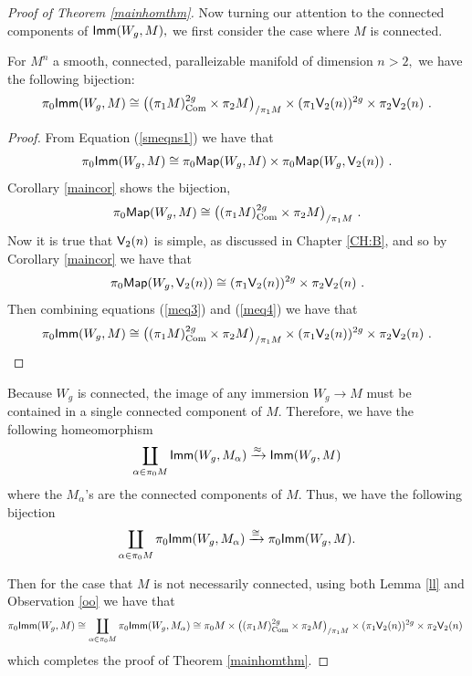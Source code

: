 \begin{proof}[Proof of Theorem \ref{mainhomthm}]
Now turning our attention to the connected components of ${\sf Imm}(W_{g}, M),$ we first consider the case where $M$ is connected.

\begin{lemma}\label{ll}
For $M^{n}$ a smooth, connected, paralleizable manifold of dimension $n > 2,$ we have the following bijection:
\[
\pi_{0}{\sf Imm}(W_{g}, M) \cong  \bigl((\pi_{1}M)^{2g}_{\rm Com} \times \pi_{2}M \bigr)_{/\pi_{1}M}\times (\pi_{1}\mathsf V_{2}(n))^{2g} \times \pi_{2}\mathsf V_{2}(n)~.
\]
\end{lemma}
\begin{proof}
From Equation (\ref{smeqns1}) we have that 
\[
\pi_{0}{\sf Imm}(W_{g}, M) \cong \pi_{0}{\sf Map}(W_{g}, M) \times \pi_{0}{\sf Map}(W_{g}, \mathsf V_{2}(n))~.
\]
Corollary \ref{maincor} shows the bijection,
\begin{equation}\label{meq3}
\pi_{0}{\sf Map}(W_{g}, M) \cong \bigl((\pi_{1}M)^{2g}_{\rm Com} \times \pi_{2}M \bigr)_{/\pi_{1}M}~.
\end{equation}
Now it is true that $\mathsf V_{2}(n)$ is simple, as discussed in Chapter \ref{CH:B}, and so by Corollary \ref{maincor} we have that
\begin{equation}\label{meq4}
\pi_{0}{\sf Map}(W_{g}, \mathsf V_{2}(n)) \cong (\pi_{1}\mathsf V_{2}(n))^{2g} \times \pi_{2}\mathsf V_{2}(n)~.
\end{equation}
Then combining equations (\ref{meq3}) and (\ref{meq4}) we have that
\[
\pi_{0}{\sf Imm}(W_{g}, M) \cong  \bigl((\pi_{1}M)^{2g}_{\rm Com} \times \pi_{2}M \bigr)_{/\pi_{1}M}\times (\pi_{1}\mathsf V_{2}(n))^{2g} \times \pi_{2}\mathsf V_{2}(n)~.
\]
\end{proof}


\begin{observation} \label{oo}
Because $W_{g}$ is connected, the image of any immersion $W_{g} \rightarrow M$ must be contained in a single connected component of $M$. Therefore, we have the following  homeomorphism \[\coprod_{\alpha \in \pi_{0}M}{\sf Imm}(W_{g}, M_{\alpha}) \xrightarrow{\approx} {\sf Imm}(W_{g}, M)\] where the $M_{\alpha}$'s are the connected components of $M.$ Thus, we have the following bijection 
\[
\coprod_{\alpha \in \pi_{0}M}\pi_{0}{\sf Imm}(W_{g}, M_{\alpha}) \xrightarrow{\cong} \pi_{0}{\sf Imm}(W_{g}, M).
\] 
\end{observation}
Then for the case that $M$ is not necessarily connected, using both Lemma \ref{ll} and Observation \ref{oo} we have that 
\[
\pi_{0}{\sf Imm}(W_{g}, M) \cong \coprod_{\alpha \in \pi_{0}M}\pi_{0}{\sf Imm}(W_{g}, M_{\alpha}) \cong \pi_{0}M \times \bigl((\pi_{1}M)^{2g}_{\rm Com} \times \pi_{2}M \bigr)_{/\pi_{1}M}\times (\pi_{1}\mathsf V_{2}(n))^{2g} \times \pi_{2}\mathsf V_{2}(n)~
\]
which completes the proof of Theorem \ref{mainhomthm}.
\end{proof}




